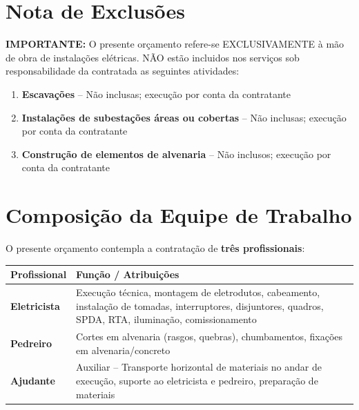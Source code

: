 \documentclass[12pt,a4paper]{article}
\renewenvironment{table}%
{\begin{center}%
\scriptsize%
\addtolength{\tabcolsep}{-2pt}%
}%
{\end{center}}
\begin{document}
\section{Nota de Exclusões}

\noindent\textbf{IMPORTANTE:} O presente orçamento refere-se EXCLUSIVAMENTE à mão de obra de instalações elétricas. NÃO estão incluidos nos serviços sob responsabilidade da contratada as seguintes atividades:

\begin{enumerate}[noitemsep]
\item \textbf{Escavações} -- Não inclusas; execução por conta da contratante
\item \textbf{Instalações de subestações áreas ou cobertas} -- Não inclusas; execução por conta da contratante
\item \textbf{Construção de elementos de alvenaria} -- Não inclusos; execução por conta da contratante
\end{enumerate}

\pagebreak

\section{Composição da Equipe de Trabalho}

O presente orçamento contempla a contratação de \textbf{três profissionais}:

\begin{table}
\centering
\begin{tabular}{lp{10cm}}
\toprule
\textbf{Profissional} & \textbf{Função / Atribuições} \\
\midrule
\textbf{Eletricista} & Execução técnica, montagem de eletrodutos, cabeamento, instalação de tomadas, interruptores, disjuntores, quadros, SPDA, RTA, iluminação, comissionamento \\
\midrule
\textbf{Pedreiro} & Cortes em alvenaria (rasgos, quebras), chumbamentos, fixações em alvenaria/concreto \\
\midrule
\textbf{Ajudante} & Auxiliar -- Transporte horizontal de materiais no andar de execução, suporte ao eletricista e pedreiro, preparação de materiais \\
\bottomrule
\end{tabular}
\end{table}
\end{document}
